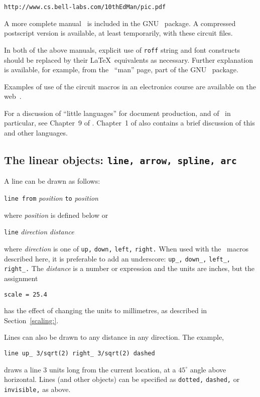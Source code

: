 \verb|http://www.cs.bell-labs.com/10thEdMan/pic.pdf|

A more complete manual~\cite{Raymond95} is included in the GNU \groff\ 
package.  A compressed postscript version is available, at least
temporarily, with these circuit files.

In both of the above manuals, explicit use of {\tt *roff} string and font
constructs should be replaced by their \LaTeX\ equivalents as necessary.
Further explanation is available, for example, from the \gpic\ 
``man'' page, part of the GNU \groff\  package.

Examples of use of the circuit macros in an electronics
course are available on the web~\cite{Clark99}.

For a discussion of ``little languages'' for document production, and
of \pic\ in particular, see Chapter~9 of \cite{Bentley88}.  Chapter~1
of \cite{Goossens97} also contains a brief discussion of this and
other languages.

\subsection{The linear objects: {\tt line, arrow, spline, arc}}
A line can be drawn as follows:

{\tt line from} {\sl position} {\tt to} {\sl position}

\noindent
where {\sl position} is defined below or

{\tt line} {\sl direction} {\sl distance}

\noindent
where {\sl direction} is one of {\tt up,} {\tt down,} {\tt left,}
{\tt right.}  When used with the \Mfour\ macros described here, it is
preferable to add an underscore: {\tt up\_,} {\tt down\_,} {\tt left\_,}
{\tt right\_.}  The {\sl distance} is a number or expression
and the units are inches, but the assignment

{\tt scale = 25.4}

\noindent
has the effect of changing the units to millimetres,
as described in Section~\ref{scaling:}.

Lines can also be drawn to any distance in any direction.  The example,

{\tt line up\_ 3/sqrt(2) right\_ 3/sqrt(2) dashed}

\noindent
draws a line 3 units long from the current location,
at a $45^\circ$ angle above horizontal.
Lines (and other objects) can be specified as {\tt dotted,} {\tt dashed,} or
{\tt invisible,} as above.

